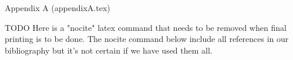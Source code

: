 Appendix A (appendixA.tex)

TODO Here is a "nocite" latex command that needs to be removed when final printing is to be done. The nocite command below include all references in our bibliography but it's not certain if we have used them all.
\nocite{*}
